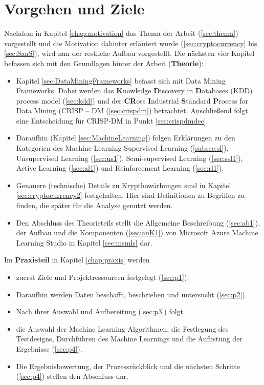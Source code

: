 \chapter{Vorgehen und Ziele}\label{chapter:Vorgehen}
Nachdem in Kapitel \ref{chap:motivation} das Thema der Arbeit (\ref{sec:thema}) vorgestellt und die Motivation dahinter erläutert wurde (\ref{sec:cryptocurrency} bis \ref{sec:SaaS}), wird nun der restliche Aufbau vorgestellt.
Die nächsten vier Kapitel befassen sich mit den Grundlagen hinter der Arbeit (\textbf{Theorie}): 
\begin{itemize}
\item Kapitel \ref{sec:DataMiningFrameworks} befasst sich mit Data Mining Frameworks. Dabei werden das \textbf{K}nowledge \textbf{D}iscovery in \textbf{D}atabases (KDD) process model (\ref{sec:kdd}) und der \textbf{CR}oss \textbf{I}ndustrial \textbf{S}tandard \textbf{P}rocess for Data Mining (CRISP – DM (\ref{sec:crispdm}) betrachtet. Anschließend folgt eine Entscheidung für CRISP-DM in Punkt \ref{sec:crispdmdec}.
\item Daraufhin (Kapitel \ref{sec:MachineLearning}) folgen Erklärungen zu den Kategorien des Machine Learning Supervised Learning (\ref{subsec:sl}), Unsupervised Learning (\ref{sec:us1}), Semi-supervised Learning (\ref{sec:ssl1}), Active Learning (\ref{sec:al1}) und Reinforcement Learning (\ref{sec:rl1}).
\item Genauere (technische) Details zu Krypthowärhungen sind in Kapitel \ref{sec:cryptocurrency2} festgehalten. Hier sind Definitionen zu Begriffen zu finden, die später für die Analyse genutzt werden.
\item Den Abschluss des Theorieteils stellt die Allgemeine Beschreibung (\ref{sec:ab1}), der Aufbau und die Komponenten (\ref{sec:auK1}) von Microsoft Azure Machine Learning Studio in Kapitel \ref{sec:msmls} dar.
\end{itemize}
Im \textbf{Praxisteil} in Kapitel \ref{chap:praxis} werden
\begin{itemize}
\item zuerst Ziele und Projektressourcen festgelegt (\ref{sec:p1}).
\item Daraufhin werden Daten beschafft, beschrieben und untersucht (\ref{sec:p2}).
\item Nach ihrer Auswahl und Aufbereitung (\ref{sec:p3}) folgt
\item die Auswahl der Machine Learning Algorithmen, die Festlegung des Testdesigns, Durchführen des Machine Learnings und die Auflistung der Ergebnisse (\ref{sec:p4}).
\item Die Ergebnisbewertung, der Prozessrückblick und die nächsten Schritte (\ref{sec:p4}) stellen den Abschluss dar.
\end{itemize}

